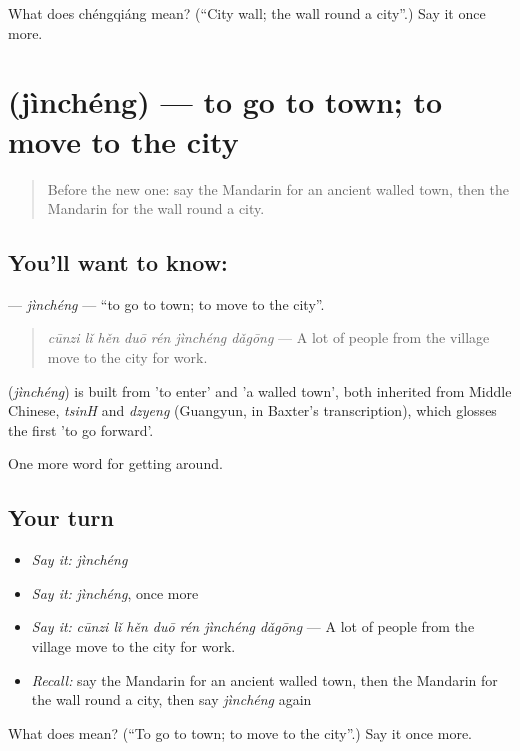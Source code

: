 \begin{tcolorbox}[breakable,colback=teal!4,colframe=teal!35!black,title={Before you move on}]
What does chéngqiáng mean? (\textquotedblleft{}City wall; the wall round a city\textquotedblright{}.) Say it once more.
\end{tcolorbox}
\section[\texorpdfstring{\zh{进城} (jìnchéng)}{进城 (jìnchéng)}]{ (jìnchéng) — to go to town; to move to the city}

\label{lesson:ZH-C446-jincheng}



\begin{quote}
Before the new one: say the Mandarin for an ancient walled town, then the Mandarin for the wall round a city.
\end{quote}

\subsection*{You'll want to know: }
\textbf{} — \emph{jìnchéng} — \textquotedblleft{}to go to town; to move to the city\textquotedblright{}.

\begin{quote}
\textbf{} \emph{cūnzi lǐ hěn duō rén jìnchéng dǎgōng} — A lot of people from the village move to the city for work.
\end{quote}

\begin{cousinweb}
\textbf{} (\emph{jìnchéng}) is built from  'to enter' and  'a walled town', both inherited from Middle Chinese, \emph{tsinH} and \emph{dzyeng} (Guangyun, in Baxter's transcription), which glosses the first 'to go forward'.
\end{cousinweb}

\begin{grammarlens}[title={What you've built}]
One more word for getting around.
\end{grammarlens}

\subsection*{Your turn}
\begin{itemize}
\raggedright
  \item \emph{Say it:} \emph{jìnchéng}
  \item \emph{Say it:} \emph{jìnchéng}, once more
  \item \emph{Say it:} \emph{cūnzi lǐ hěn duō rén jìnchéng dǎgōng} — A lot of people from the village move to the city for work.
  \item \emph{Recall:} say the Mandarin for an ancient walled town, then the Mandarin for the wall round a city, then say \emph{jìnchéng} again
\end{itemize}

\begin{tcolorbox}[breakable,colback=teal!4,colframe=teal!35!black,title={Before you move on}]
What does  mean? (\textquotedblleft{}To go to town; to move to the city\textquotedblright{}.) Say it once more.
\end{tcolorbox}
